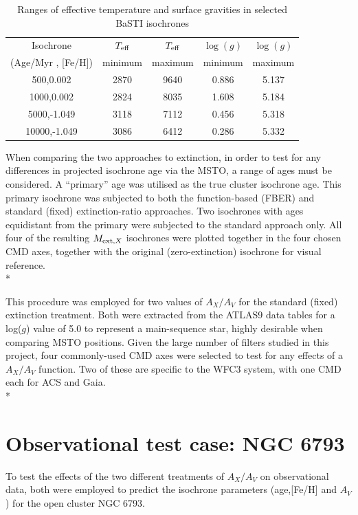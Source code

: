 \documentclass[12pt, a4paper]{report}
\begin{document}
\begin{table}
\begin{center}
\begin{tabular}{ccccc}
\hline
Isochrone & $T_{\textnormal{eff}}$ & $T_{\textnormal{eff}}$ & $\log(g)$ & $\log(g)$ \\
(Age/Myr , [Fe/H]) & minimum & maximum & minimum & maximum \\
\hline
500,0.002 & 2870 & 9640 & 0.886 & 5.137 \\
1000,0.002 & 2824 & 8035 & 1.608 & 5.184 \\
5000,-1.049 & 3118 & 7112 & 0.456 & 5.318 \\
10000,-1.049 & 3086 & 6412 & 0.286 & 5.332 \\
\hline
\end{tabular}
\caption{Ranges of effective temperature and surface gravities in selected BaSTI isochrones}
\label{variable_ranges}
\end{center}
\end{table}

When comparing the two approaches to extinction, in order to test for any differences in projected isochrone age via the MSTO, a range of ages must be considered. A ``primary'' age was utilised as the true cluster isochrone age. This primary isochrone was subjected to both the function-based (FBER) and standard (fixed) extinction-ratio approaches. Two isochrones with ages equidistant from the primary were subjected to the standard approach only. All four of the resulting $M_{\textnormal{ext},X}$ isochrones were plotted together in the four chosen CMD axes, together with the original (zero-extinction) isochrone for visual reference.\\*

This procedure was employed for two values of $A_{X}/A_{V}$ for the standard (fixed) extinction treatment. Both were extracted from the ATLAS9 data tables for a log($g$) value of 5.0 to represent a main-sequence star, highly desirable when comparing MSTO positions. Given the large number of filters studied in this project, four commonly-used CMD axes were selected to test for any effects of a $A_{X}/A_{V}$ function. Two of these are specific to the WFC3 system, with one CMD each for ACS and Gaia.\\*

\section{Observational test case: NGC 6793}
To test the effects of the two different treatments of $A_{X}/A_{V}$ on observational data, both were employed to predict the isochrone parameters (age,[Fe/H] and $A_{V}$) for the open cluster NGC 6793.
\end{document}
